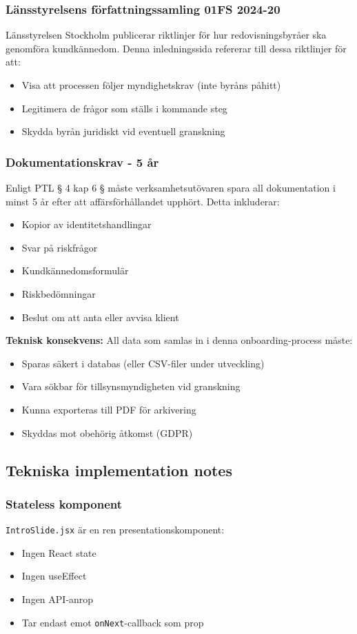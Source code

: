 \documentclass[12pt,a4paper]{article}
\begin{document}
\subsubsection{Länsstyrelsens författningssamling 01FS 2024-20}
Länsstyrelsen Stockholm publicerar riktlinjer för hur redovisningsbyråer ska genomföra kundkännedom. Denna inledningssida refererar till dessa riktlinjer för att:
\begin{itemize}[noitemsep]
  \item Visa att processen följer myndighetskrav (inte byråns påhitt)
  \item Legitimera de frågor som ställs i kommande steg
  \item Skydda byrån juridiskt vid eventuell granskning
\end{itemize}

\subsubsection{Dokumentationskrav - 5 år}
Enligt PTL § 4 kap 6 § måste verksamhetsutövaren spara all dokumentation i minst 5 år efter att affärsförhållandet upphört. Detta inkluderar:
\begin{itemize}[noitemsep]
  \item Kopior av identitetshandlingar
  \item Svar på riskfrågor
  \item Kundkännedomsformulär
  \item Riskbedömningar
  \item Beslut om att anta eller avvisa klient
\end{itemize}

\textbf{Teknisk konsekvens:}
All data som samlas in i denna onboarding-process måste:
\begin{itemize}[noitemsep]
  \item Sparas säkert i databas (eller CSV-filer under utveckling)
  \item Vara sökbar för tillsynsmyndigheten vid granskning
  \item Kunna exporteras till PDF för arkivering
  \item Skyddas mot obehörig åtkomst (GDPR)
\end{itemize}

\subsection{Tekniska implementation notes}

\subsubsection{Stateless komponent}
\texttt{IntroSlide.jsx} är en ren presentationskomponent:
\begin{itemize}[noitemsep]
  \item Ingen React state
  \item Ingen useEffect
  \item Ingen API-anrop
  \item Tar endast emot \texttt{onNext}-callback som prop
\end{itemize}
\end{document}
